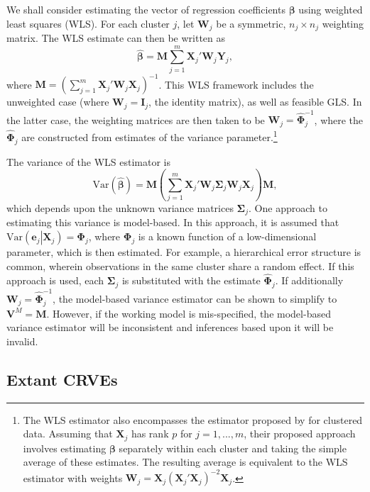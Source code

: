 \documentclass[12pt]{article}\usepackage[]{graphicx}\usepackage[]{color}
\newcommand{\Var}{\text{Var}}
\newcommand{\bm}{\mathbf}
\newcommand{\bs}{\boldsymbol}
\begin{document}
We shall consider estimating the vector of regression coefficients $\bm\beta$ using weighted least squares (WLS). For each cluster $j$, let $\bm{W}_j$ be a symmetric, $n_j \times n_j$ weighting matrix. The WLS estimate can then be written as
\begin{equation}
\label{eq:WLS}
\bs{\hat\beta} = \bm{M} \sum_{j=1}^m \bm{X}_j' \bm{W}_j \bm{Y}_j, 
\end{equation}
where $\bm{M} = \left(\sum_{j=1}^m \bm{X}_j' \bm{W}_j \bm{X}_j\right)^{-1}$. %
This WLS framework includes the unweighted case (where $\bm{W}_j = \bm{I}_j$, the identity matrix), as well as feasible GLS. In the latter case, the weighting matrices are then taken to be $\bm{W}_j = \hat{\bs\Phi}_j^{-1}$, where the $\hat{\bs\Phi}_j$ are constructed from estimates of the variance parameter.\footnote{
The WLS estimator also encompasses the estimator proposed by \citet{Ibragimov2010tstatistic} for clustered data. 
Assuming that $\bm{X}_j$ has rank $p$ for $j = 1,...,m$, their proposed approach involves estimating $\bs\beta$ separately within each cluster and taking the simple average of these estimates. 
The resulting average is equivalent to the WLS estimator with weights $\bm{W}_j = \bm{X}_j \left(\bm{X}_j'\bm{X}_j\right)^{-2} \bm{X}_j$.}

The variance of the WLS estimator is 
\begin{equation}
\label{eq:var_WLS}
\Var\left(\bs{\hat\beta}\right) = \bm{M}\left(\sum_{j=1}^m \bm{X}_j' \bm{W}_j \bs\Sigma_j \bm{W}_j\bm{X}_j\right) \bm{M},
\end{equation}
which depends upon the unknown variance matrices $\bm\Sigma_j$. 
One approach to estimating this variance is model-based. 
In this approach, it is assumed that $\Var\left(\bm{e}_j\left|\bm{X}_j\right.\right) = \bs\Phi_j$, where $\bs\Phi_j$ is a known function of a low-dimensional parameter, which is then estimated. 
For example, a hierarchical error structure is common, wherein observations in the same cluster share a random effect. 
If this approach is used, each $\bs\Sigma_j$ is substituted with the estimate $\hat{\bs\Phi}_j$. 
If additionally $\bm{W}_j = \hat{\bs\Phi}_j^{-1}$, the model-based variance estimator can be shown to simplify to $\bm{V}^M = \bm{M}$. 
However, if the working model is mis-specified, the model-based variance estimator will be inconsistent and inferences based upon it will be invalid. 

\subsection{Extant CRVEs}
\end{document}
